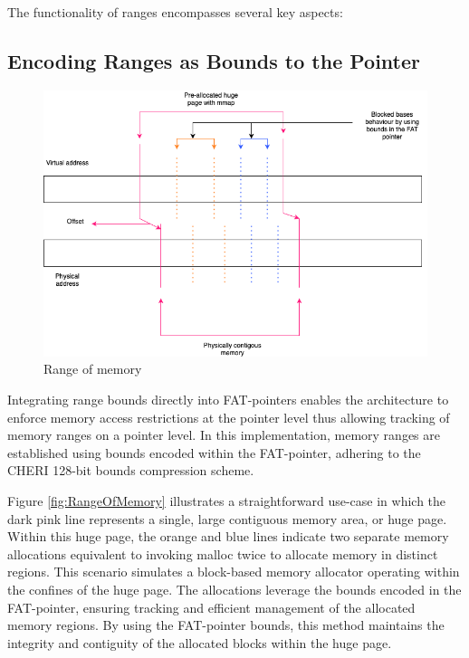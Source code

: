 \documentclass[11pt]{article}
\begin{document}
The functionality of ranges encompasses
several key aspects:

\subsection{Encoding Ranges as Bounds to the Pointer}
\label{sec:org333c91d}
\begin{figure}[htbp]
\centering
\includegraphics[width=.9\linewidth]{diagram/AllocationOverview24.png}
\caption{\label{fig:org7770b41}Range of memory}
\end{figure}

Integrating range bounds directly into FAT-pointers enables the architecture 
to enforce memory access restrictions at the pointer level thus allowing 
tracking of memory ranges on a pointer level. In this implementation, memory ranges are established using
bounds encoded within the FAT-pointer, adhering to the CHERI
128-bit bounds compression scheme\cite{woodruff_cheri_2019}.

Figure \ref{fig:RangeOfMemory} illustrates a straightforward use-case in which the dark pink line represents a single, 
large contiguous memory area, or huge page. Within this huge page, the orange and blue lines indicate 
two separate memory allocations equivalent to invoking malloc twice to allocate memory in distinct regions. 
This scenario simulates a block-based memory allocator operating within the confines of the huge page. 
The allocations leverage the bounds encoded in the FAT-pointer, ensuring tracking and efficient 
management of the allocated memory regions. By using the FAT-pointer bounds, this method maintains the 
integrity and contiguity of the allocated blocks within the huge page.
\end{document}

